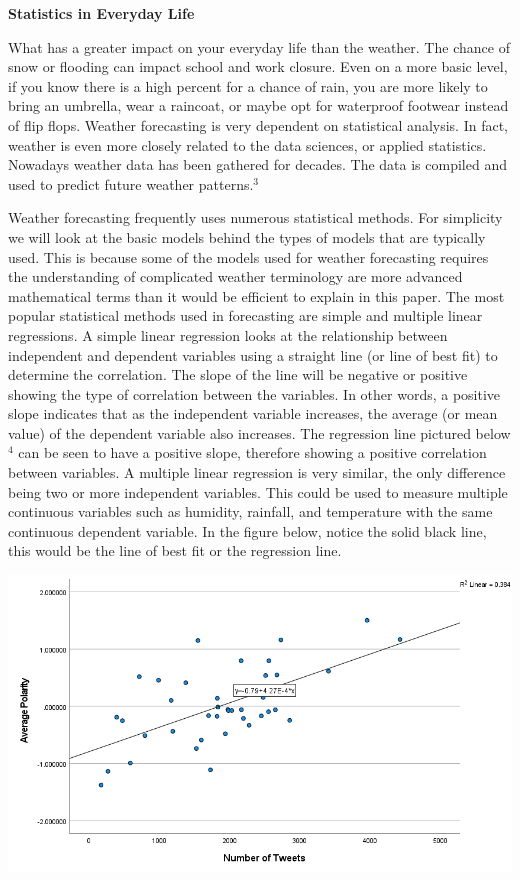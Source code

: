 \documentclass[11pt]{article}
\begin{document}
\bigskip

\noindent \color{RoyalPurple} \textbf{\large Statistics in Everyday Life}

\bigskip
\color{black}

What has a greater impact on your everyday life than the weather. The chance of snow or flooding can impact school and work closure. Even on a more basic level, if you know there is a high percent for a chance of rain, you are more likely to bring an umbrella, wear a raincoat, or maybe opt for waterproof footwear instead of flip flops. Weather forecasting is very dependent on statistical analysis. In fact, weather is even more closely related to the data sciences, or applied statistics. Nowadays weather data has been gathered for decades. The data is compiled and used to predict future weather patterns.$^3$ 

\bigskip
Weather forecasting frequently uses numerous statistical methods. For simplicity we will look at the basic models behind the types of models that are typically used. This is because some of the models used for weather forecasting requires the understanding of complicated weather terminology are more advanced mathematical terms than it would be efficient to explain in this paper. The most popular statistical methods used in forecasting are simple and multiple linear regressions. A simple linear regression looks at the relationship between independent and dependent variables using a straight line (or line of best fit) to determine the correlation. The slope of the line will be negative or positive showing the type of correlation between the variables. In other words, a positive slope indicates that as the independent variable increases, the average (or mean value) of the dependent variable also increases. The regression line pictured below$^4$ can be seen to have a positive slope, therefore showing a positive correlation between variables. A multiple linear regression is very similar, the only difference being two or more independent variables. This could be used to measure multiple continuous variables such as humidity, rainfall, and temperature with the same continuous dependent variable. In the figure below, notice the solid black line, this would be the line of best fit or the regression line.
\bigskip
 
\begin{center}
\includegraphics[scale=.75]{ScatterPlot}
\end{center}
\end{document}
